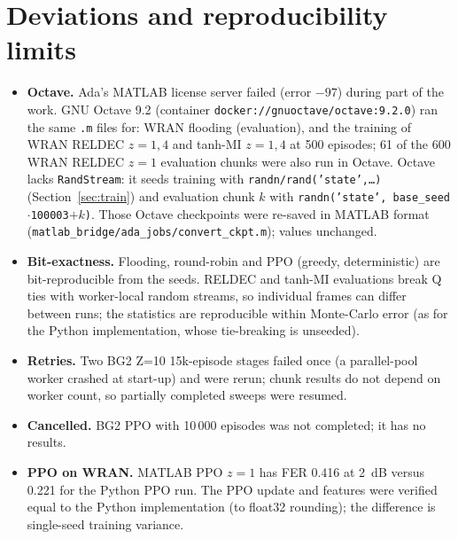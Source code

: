 \documentclass[10pt,a4paper]{article}
\begin{document}
\section{Deviations and reproducibility limits}\label{sec:dev}
\begin{itemize}
\item \textbf{Octave.} Ada's MATLAB license server failed (error $-97$) during part of the work. GNU Octave 9.2
(container \texttt{docker://gnuoctave/octave:9.2.0}) ran the same \texttt{.m} files for: WRAN flooding (evaluation), and the training
of WRAN RELDEC $z{=}1,4$ and tanh-MI $z{=}1,4$ at 500 episodes; 61 of the 600 WRAN RELDEC $z{=}1$ evaluation chunks were also run in Octave.
Octave lacks \texttt{RandStream}: it seeds training with \texttt{randn/rand('state',\dots)} (Section~\ref{sec:train}) and evaluation
chunk $k$ with \texttt{randn('state', base\_seed$\cdot$100003$+k$)}. Those Octave checkpoints were re-saved in MATLAB format
(\texttt{matlab\_bridge/ada\_jobs/convert\_ckpt.m}); values unchanged.
\item \textbf{Bit-exactness.} Flooding, round-robin and PPO (greedy, deterministic) are bit-reproducible from the seeds.
RELDEC and tanh-MI evaluations break Q ties with worker-local random streams, so individual frames can differ between runs;
the statistics are reproducible within Monte-Carlo error (as for the Python implementation, whose tie-breaking is unseeded).
\item \textbf{Retries.} Two BG2 Z=10 15k-episode stages failed once (a parallel-pool worker crashed at start-up) and were rerun;
chunk results do not depend on worker count, so partially completed sweeps were resumed.
\item \textbf{Cancelled.} BG2 PPO with 10\,000 episodes was not completed; it has no results.
\item \textbf{PPO on WRAN.} MATLAB PPO $z{=}1$ has FER 0.416 at 2~dB versus 0.221 for the Python PPO run. The PPO update and features
were verified equal to the Python implementation (to float32 rounding); the difference is single-seed training variance.
\end{itemize}
\end{document}

